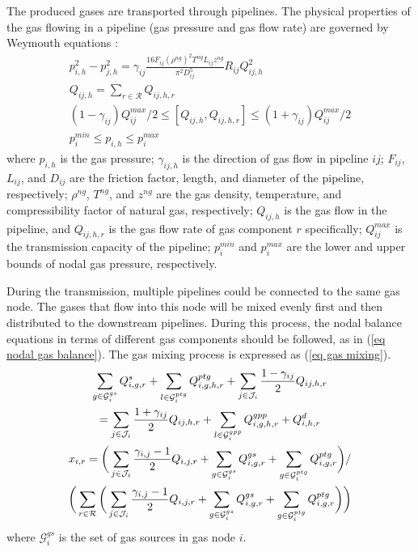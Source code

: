 \documentclass[sn-mathphys,Numbered]{sn-jnl}%
\theoremstyle{thmstyleone}%
\theoremstyle{thmstyletwo}%
\theoremstyle{thmstylethree}%
\begin{document}
The produced gases are transported through pipelines. The physical properties of the gas flowing in a pipeline (gas pressure and gas flow rate) are governed by Weymouth equations \cite{an2003natural}:
\begin{gather}
    p_{i,h}^2 - p_{j,h}^2 = \gamma_{ij} \frac{16 F_{ij} (\rho^{ng})^2 T^{ng} L_{ij}z^{ng}}{\pi^2 D_{ij}^5} {R}_{ij} {Q}_{ij,h}^2
\label{eq gas flow weymouth} \\
     Q_{ij,h} = \sum_{r \in \mathcal{R}} Q_{ij,h,r}
\label{eq gas flow sum, gas constant} \\
    (1-\gamma_{ij})Q_{ij}^{max}/2 \leq [Q_{ij,h}, Q_{ij,h,r}] 
    \leq (1+\gamma_{ij})Q_{ij}^{max}/2
\label{eq capacity pipeline} \\
    p_i^{min} \leq p_{i,h} \leq p_i^{max}
\label{eq pressure limit}
\end{gather}
where $p_{i,h}$ is the gas pressure; $\gamma_{ij,h}$ is the direction of gas flow in pipeline $ij$; $F_{ij}$, $L_{ij}$, and $D_{ij}$ are the friction factor, length, and diameter of the pipeline, respectively; $\rho^{ng}$, $T^{ng}$, and $z^{ng}$ are the gas density, temperature, and compressibility factor of natural gas, respectively; $Q_{ij,h}$ is the gas flow in the pipeline, and $Q_{ij,h,r}$ is the gas flow rate of gas component $r$ specifically; $Q_{ij}^{max}$ is the transmission capacity of the pipeline; $p_i^{min}$ and $p_i^{max}$ are the lower and upper bounds of nodal gas pressure, respectively.

During the transmission, multiple pipelines could be connected to the same gas node. The gases that flow into this node will be mixed evenly first and then distributed to the downstream pipelines. During this process, the nodal balance equations in terms of different gas components should be followed, as in (\ref{eq nodal gas balance}). The gas mixing process is expressed as (\ref{eq gas mixing}).
\begin{gather}
    \sum_{g\in \mathcal{G}_i^{gs}} {Q_{i,g,r}^{s}} + \sum_{l \in \mathcal{G}_i^{ptg}}{Q_{i,g,h,r}^{ptg}}
    + \sum_{j \in \mathcal{J}_i}{\frac{1-\gamma_{ij}}{2} Q_{ij,h,r}} \notag \\
    = \sum_{j \in \mathcal{J}_i}{\frac{1+\gamma_{ij}}{2} Q_{ij,h,r} } + 
    \sum_{l \in \mathcal{G}_i^{gpp}} Q_{i,g,h,r}^{gpp}
    + Q_{i,h,r}^{d}
\label{eq nodal gas balance} \\
    x_{i,r} = \bigg( \sum_{j \in \mathcal{J}_i} {\frac{\gamma_{i,j}-1}{2} Q_{i,j,r}} 
    + \sum_{g\in \mathcal{G}_i^{gs}} {Q_{i,g,r}^{gs}} 
    + \sum_{g\in \mathcal{G}_i^{ptg}} {Q_{i,g,r}^{ptg}} \bigg) / 
\notag \\
    \bigg( \sum_{r \in \mathcal{R}} \bigg( \sum_{j \in \mathcal{J}_i} {\frac{\gamma_{i,j}-1}{2} Q_{i,j,r}} 
    + \sum_{g\in \mathcal{G}_i^{gs}} {Q_{i,g,r}^{gs}} 
    + \sum_{g\in \mathcal{G}_i^{ptg}} {Q_{i,g,r}^{ptg}} \bigg) \bigg)
\label{eq gas mixing}
\end{gather}
where $\mathcal{G}_i^{gs}$ is the set of gas sources in gas node $i$.
\end{document}
